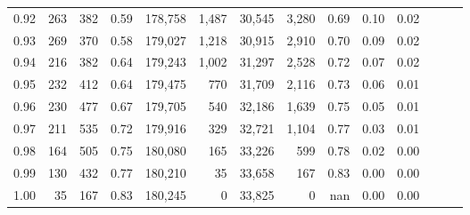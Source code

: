 \begin{tabular}{rrrrrrrrrrrrrr}
0.92 &    263 &  382 &  0.59 &  178,758 &    1,487 &  30,545 &   3,280 &  0.69 &  0.10 &      0.02 \\
0.93 &    269 &  370 &  0.58 &  179,027 &    1,218 &  30,915 &   2,910 &  0.70 &  0.09 &      0.02 \\
0.94 &    216 &  382 &  0.64 &  179,243 &    1,002 &  31,297 &   2,528 &  0.72 &  0.07 &      0.02 \\
0.95 &    232 &  412 &  0.64 &  179,475 &      770 &  31,709 &   2,116 &  0.73 &  0.06 &      0.01 \\
0.96 &    230 &  477 &  0.67 &  179,705 &      540 &  32,186 &   1,639 &  0.75 &  0.05 &      0.01 \\
0.97 &    211 &  535 &  0.72 &  179,916 &      329 &  32,721 &   1,104 &  0.77 &  0.03 &      0.01 \\
0.98 &    164 &  505 &  0.75 &  180,080 &      165 &  33,226 &     599 &  0.78 &  0.02 &      0.00 \\
0.99 &    130 &  432 &  0.77 &  180,210 &       35 &  33,658 &     167 &  0.83 &  0.00 &      0.00 \\
1.00 &     35 &  167 &  0.83 &  180,245 &        0 &  33,825 &       0 &   nan &  0.00 &      0.00 \\
\bottomrule
\end{tabular}
